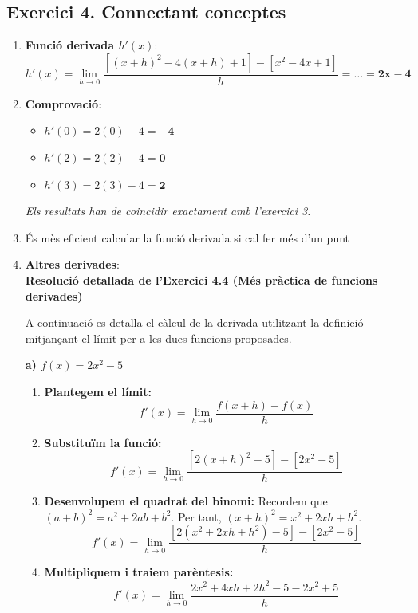 \documentclass[12pt,a4paper]{article}
\begin{document}
\subsection*{Exercici 4. Connectant conceptes}
\begin{enumerate}[label=\textbf{\arabic*.}]
    \item \textbf{Funció derivada $h'(x)$}:
    \[ h'(x) = \lim_{h \to 0} \frac{[(x+h)^2-4(x+h)+1] - [x^2-4x+1]}{h} = \dots = \mathbf{2x - 4} \]
    \item \textbf{Comprovació}:
    \begin{itemize}
        \item $h'(0) = 2(0)-4 = \mathbf{-4}$
        \item $h'(2) = 2(2)-4 = \mathbf{0}$
        \item $h'(3) = 2(3)-4 = \mathbf{2}$
    \end{itemize}
    \textit{Els resultats han de coincidir exactament amb l'exercici 3.}
    \item És mès eficient calcular la funció derivada si cal fer més d'un punt
    \item \textbf{Altres derivades}: \\
\vspace{1cm}
\noindent\textbf{Resolució detallada de l'Exercici 4.4 (Més pràctica de funcions derivades)}

A continuació es detalla el càlcul de la derivada utilitzant la definició mitjançant el límit per a les dues funcions proposades.

\vspace{0.5cm}
\textbf{a) $f(x) = 2x^2 - 5$}

\begin{enumerate}
    \item \textbf{Plantegem el límit:}
    \[ f'(x) = \lim_{h \to 0} \frac{f(x+h) - f(x)}{h} \]
    
    \item \textbf{Substituïm la funció:}
    \[ f'(x) = \lim_{h \to 0} \frac{[2(x+h)^2 - 5] - [2x^2 - 5]}{h} \]
    
    \item \textbf{Desenvolupem el quadrat del binomi:}
    Recordem que $(a+b)^2 = a^2 + 2ab + b^2$. Per tant, $(x+h)^2 = x^2 + 2xh + h^2$.
    \[ f'(x) = \lim_{h \to 0} \frac{[2(x^2 + 2xh + h^2) - 5] - [2x^2 - 5]}{h} \]
    
    \item \textbf{Multipliquem i traiem parèntesis:}
    \[ f'(x) = \lim_{h \to 0} \frac{2x^2 + 4xh + 2h^2 - 5 - 2x^2 + 5}{h} \]
    

\end{enumerate}
\end{enumerate}
\end{document}
